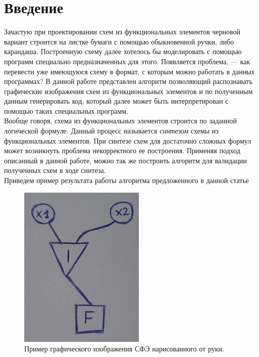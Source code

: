\documentclass[makeidx, a4paper, 14pt]{extarticle}
\begin{document}
\section{Введение}
Зачастую при проектировании схем из функциональных элементов черновой вариант строится на листке бумаги с помощью обыкновенной ручки, либо карандаша.
Построенную схему далее хотелось бы моделировать с помощью программ специально предназначенных для этого. Появляется проблема, --- как перевести уже
имеющуюся схему в формат, с которым можно работать в данных программах? В данной работе представлен алгоритм позволяющий распознавать графические изображения
схем из функциональных элементов и по полученным данным генерировать код, который далее может быть интерпретирован с помощью таких специальных программ. \\
Вообще говоря, схема из функциональных элементов строится по заданной логической формуле. Данный процесс называется \emph{синтезом} схемы из функциональных элементов.
При синтезе схем для достаточно сложных формул может возникнуть проблема некорректного ее построения. Применяя подход описанный в данной работе, можно так же построить
алгоритм для валидации полученных схем в ходе синтеза. \\

Приведем пример результата работы алгоритма предложенного в данной статье 

\begin{figure}[H]
    \centering
    \includegraphics[width=60mm]{handwritten_2.png}
    \caption{Пример графического изображения СФЭ нарисованного от руки.}
    \label{fig:handwritten_2}
\end{figure}
\end{document}
